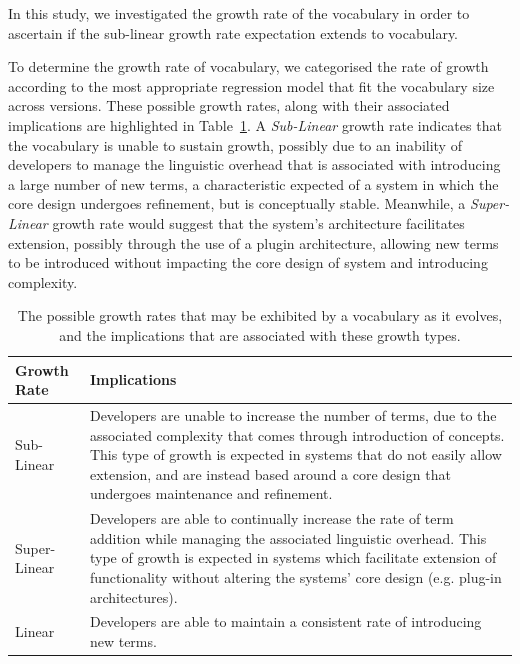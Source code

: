 

In this study, we investigated the growth rate of the vocabulary in order to ascertain if the sub-linear growth rate expectation extends to vocabulary.

To determine the growth rate of vocabulary, we categorised the rate of growth according to the most appropriate regression model that fit the vocabulary size across versions. These possible growth rates, along with their associated implications are highlighted in Table~\ref{tab:vocab_growth_rate_implications}. A \emph{Sub-Linear} growth rate indicates that the vocabulary is unable to sustain growth, possibly due to an inability of developers to manage the linguistic overhead that is associated with introducing a large number of new terms, a characteristic expected of a system in which the core design undergoes refinement, but is conceptually stable. Meanwhile, a \emph{Super-Linear} growth rate would suggest that the system's architecture facilitates extension, possibly through the use of a plugin architecture, allowing new terms to be introduced without impacting the core design of system and introducing complexity.

\begin{table}[t]
\centering
\begin{tabular}{|p{}|p{}|}
\hline
{\bf Growth Rate} & {\bf Implications}\\
\hline
\hline
Sub-Linear
&
Developers are unable to increase the number of terms, due to the associated complexity that comes through introduction of concepts. This type of growth is expected in systems that do not easily allow extension, and are instead based around a core design that undergoes maintenance and refinement. 
\\
\hline
Super-Linear
&
Developers are able to continually increase the rate of term addition while managing the associated linguistic overhead. This type of growth is expected in systems which facilitate extension of functionality without altering the systems' core design (e.g. plug-in architectures).
\\
\hline
Linear
&
Developers are able to maintain a consistent rate of introducing new terms.
\\
\hline
\end{tabular}
\vspace{0.2cm}
\caption{The possible growth rates that may be exhibited by a vocabulary as it evolves, and the implications that are associated with these growth types.}
\label{tab:vocab_growth_rate_implications}
\vspace{-0.2cm}
\end{table}

